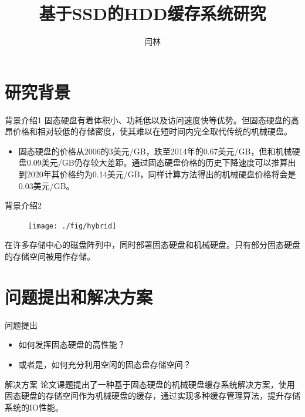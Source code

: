 \documentclass[compress]{beamer}
\title{基于SSD的HDD缓存系统研究}
\author{闫林}
\institute{
指导教师：刘凯教授\\
\vspace{5mm}
计算机学院\\
西安电子科技大学\\
}
\begin{document}
\begin{frame}[plain] %
  \titlepage
\end{frame}


\section{研究背景}
\begin{frame}{背景介绍1}
固态硬盘有着体积小、功耗低以及访问速度快等优势。但固态硬盘的高昂价格和相对较低的存储密度，使其难以在短时间内完全取代传统的机械硬盘。
\begin{itemize}
    \item 固态硬盘的价格从2006的3美元/GB，跌至2014年的0.67美元/GB，但和机械硬盘0.09美元/GB仍存较大差距。通过固态硬盘价格的历史下降速度可以推算出到2020年其价格约为0.14美元/GB，同样计算方法得出的机械硬盘价格将会是0.03美元/GB。
\end{itemize}
\end{frame}

\begin{frame}{背景介绍2}
\begin{figure}
\texttt{[image: ./fig/hybrid]}
\end{figure}
在许多存储中心的磁盘阵列中，同时部署固态硬盘和机械硬盘。只有部分固态硬盘的存储空间被用作存储。
\end{frame}

\section{问题提出和解决方案}
\begin{frame}{问题提出}
\begin{itemize}
    \item 如何发挥固态硬盘的高性能？
    \item 或者是，如何充分利用空闲的固态盘存储空间？
\end{itemize}
\end{frame}

\begin{frame}{解决方案}
论文课题提出了一种基于固态硬盘的机械硬盘缓存系统解决方案，使用固态硬盘的存储空间作为机械硬盘的缓存，通过实现多种缓存管理算法，提升存储系统的IO性能。
\end{frame}
\end{document}
